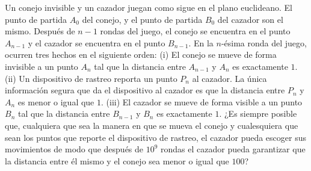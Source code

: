 Un conejo invisible y un cazador juegan como sigue en el plano euclideano. El punto de partida $A_0$ del conejo, y el punto de partida $B_0$ del cazador son el mismo. Después de $n−1$ rondas del juego, el conejo se encuentra en el punto $A_{n−1}$ y el cazador se encuentra en el punto $B_{n−1}$. En la $n$-ésima ronda del juego, ocurren tres hechos en el siguiente orden:  \newline 
(i) El conejo se mueve de forma invisible a un punto $A_n$ tal que la distancia entre $A_{n−1}$ y $A_n$ es exactamente $1$.  \newline 
(ii) Un dispositivo de rastreo reporta un punto $P_n$ al cazador. La única información segura que da el dispositivo al cazador es que la distancia entre $P_n$ y $A_n$ es menor o igual que $1$.  \newline 
(iii) El cazador se mueve de forma visible a un punto $B_n$ tal que la distancia entre $B_{n−1}$ y $B_n$ es exactamente $1$.  \newline 
¿Es siempre posible que, cualquiera que sea la manera en que se mueva el conejo y cualesquiera que sean los puntos que reporte el dispositivo de rastreo, el cazador pueda escoger sus movimientos de modo que después de $10^9$ rondas el cazador pueda garantizar que la distancia entre él mismo y el conejo sea menor o igual que $100$?